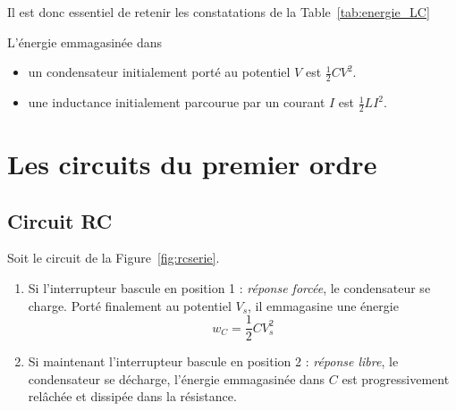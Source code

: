 Il est donc essentiel de retenir les constatations de la Table~\ref{tab:energie_LC} 

\begin{table}[h]
	\caption{Énergie emmagasinée dans un condensateur ou dans une bobine.\label{tab:energie_LC}}
	\begin{boxedminipage}{\linewidth}
		L'énergie emmagasinée dans
		\begin{itemize}
			\item un condensateur initialement porté au potentiel $V$ est $\frac{1}{2}CV^2$.
			\item une inductance initialement parcourue par un courant $I$ est $\frac{1}{2}LI^2$.
		\end{itemize}
	\end{boxedminipage}
\end{table}


\section{Les circuits du premier ordre}
\subsection{Circuit RC}
\begin{marginfigure}
\centering

\caption{Circuit illustrant les réponses forcées et libres d'un circuit RC.}
\label{fig:rcserie}
\end{marginfigure}
Soit le circuit de la Figure~\ref{fig:rcserie}.
\begin{enumerate}
	\item Si l'interrupteur bascule en position 1 : {\em réponse forcée}, le 
	condensateur se charge. Porté finalement  au potentiel $V_s$, il emmagasine une
	énergie
	\[w_C=\frac{1}{2}CV_s^2\]
	\item Si maintenant l'interrupteur bascule en position 2 : {\em réponse libre}, le condensateur se décharge, l'énergie emmagasinée dans $C$ est progressivement relâchée et dissipée dans la résistance.
\end{enumerate}


